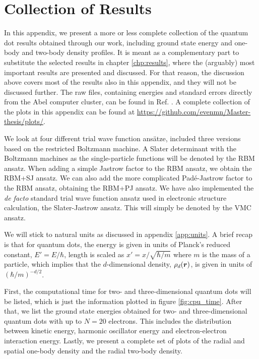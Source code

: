 \chapter{Collection of Results} \label{chp:totalresults}
In this appendix, we present a more or less complete collection of the quantum dot results obtained through our work, including ground state energy and one-body and two-body density profiles. It is meant as a complementary part to substitute the selected results in chapter \ref{chp:results}, where the (arguably) most important results are presented and discussed. For that reason, the discussion above covers most of the results also in this appendix, and they will not be discussed further. The raw files, containing energies and standard errors directly from the Abel computer cluster, can be found in Ref. \cite{nordhagen_even_marius_2019_3477946}. A complete collection of the plots in this appendix can be found at \url{https://github.com/evenmn/Master-thesis/plots/}. 

We look at four different trial wave function ansätze, included three versions based on the restricted Boltzmann machine. A Slater determinant with the Boltzmann machines as the single-particle functions will be denoted by the RBM ansatz. When adding a simple Jastrow factor to the RBM ansatz, we obtain the RBM+SJ ansatz. We can also add the more complicated Padé-Jastrow factor to the RBM ansatz, obtaining the RBM+PJ ansatz. We have also implemented the \textit{de facto} standard trial wave function ansatz used in electronic structure calculation, the Slater-Jastrow ansatz. This will simply be denoted by the VMC ansatz. 

We will stick to natural units as discussed in appendix \ref{app:units}. A brief recap is that for quantum dots, the energy is given in units of Planck's reduced constant, $E'=E/\hbar$, length is scaled as $x'=x/\sqrt{\hbar/m}$ where $m$ is the mass of a particle, which implies that the $d$-dimensional density, $\rho_d(\boldsymbol{{r}})$, is given in units of $(\hbar/m)^{-d/2}$.

First, the computational time for two- and three-dimensional quantum dots will be listed, which is just the information plotted in figure \eqref{fig:cpu_time}. After that, we list the ground state energies obtained for two- and three-dimensional quantum dots with up to $N=20$ electrons. This includes the distribution between kinetic energy, harmonic oscillator energy and electron-electron interaction energy. Lastly, we present a complete set of plots of the radial and spatial one-body density and the radial two-body density. 

